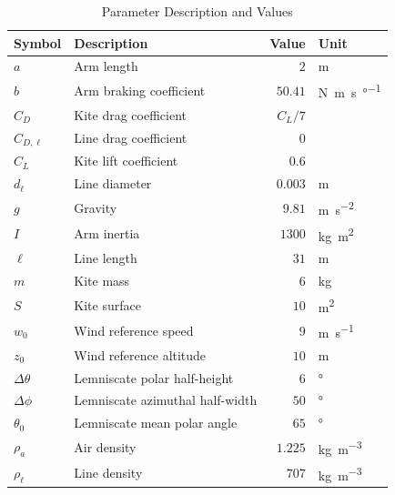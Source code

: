 \begin{table}[thpb]
\centering
\caption{Parameter Description and Values}
\label{tab:params}
\begin{tabular}{l p{3.2cm} r l}
    \toprule
    {Symbol} & {Description} & {Value} & {Unit} \\
    \midrule
    $a$ & Arm length & $2$ & \si{\meter} \\ 
    $b$ & Arm braking coefficient & $50.41$ & \si{\newton\meter\second\per\degree} \\ 
    $C_D$ & Kite drag coefficient & $C_L / 7$ &  \\ 
    $C_{D,\ell}$ & Line drag coefficient & $0$ &  \\ 
    $C_L$ & Kite lift coefficient & $0.6$ &  \\ 
    $d_\ell$ & Line diameter & $0.003$ & \si{\meter} \\ 
    $g$ & Gravity & $9.81$ & \si{\meter\per\square\second} \\ 
    $I$ & Arm inertia & $1300$ & \si{\kg\square\meter} \\ 
    $\ell$ & Line length & $31$ & \si{\meter} \\ 
    $m$ & Kite mass & $6$ & \si{\kg} \\ 
    $S$ & Kite surface & $10$ & \si{\square\meter} \\ 
    $w_0$ & Wind reference speed & $9$ & \si{\meter\per\second} \\ 
    $z_0$ & Wind reference altitude & $10$ & \si{\meter} \\ 
    $\Delta\theta$ & Lemniscate polar half-height & $6$ & \si{\degree} \\ 
    $\Delta\phi$ & Lemniscate azimuthal half-width & $50$ & \si{\degree} \\ 
    $\theta_0$ & Lemniscate mean polar angle & $65$ & \si{\degree} \\ 
    $\rho_a$ & Air density & $1.225$ & \si{\kg\per\cubic\meter} \\ 
    $\rho_\ell$ & Line density & $707$ & \si{\kg\per\cubic\meter} \\ 
    \bottomrule
\end{tabular}
\end{table}
